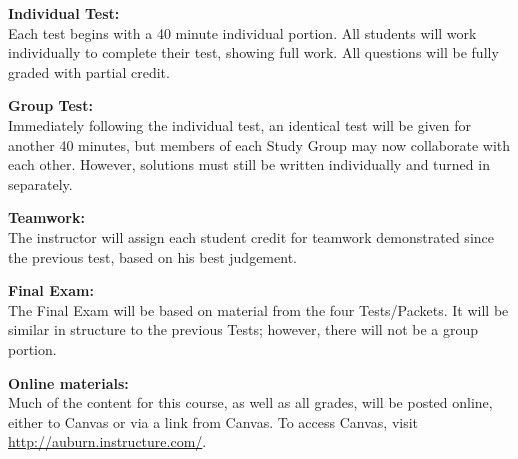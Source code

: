 {\textbf{Individual Test:} \\
Each test begins with a 40 minute individual portion. All students will work
individually to complete their test, showing full work. All questions will be
fully graded with partial credit.

\newpage

\textbf{Group Test:} \\
Immediately following the individual test, an identical test will be given
for another 40 minutes, but members of each Study Group may now collaborate
with each other. However, solutions must still be written individually and
turned in separately.

\textbf{Teamwork:} \\
The instructor will assign each student credit for teamwork demonstrated since
the previous test, based on his best judgement.

\textbf{Final Exam:} \\
The Final Exam will be based on material from the four Tests/Packets. It will
be similar in structure to the previous Tests; however, there will not be
a group portion.

\textbf{Online materials:}\\
Much of the content for this course, as well as all grades, will be posted
online, either to Canvas or via a link from Canvas. To access Canvas, visit
\url{http://auburn.instructure.com/}.
}


\newcommand{\PostScript}{}





